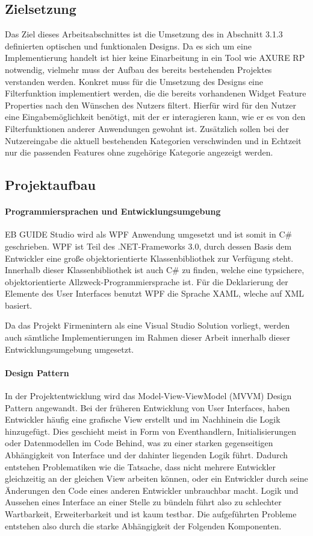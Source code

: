 \subsection {Zielsetzung}
Das Ziel dieses Arbeitsabschnittes ist die Umsetzung des in Abschnitt 3.1.3 definierten optischen und funktionalen Designs.
Da es sich um eine Implementierung handelt ist hier keine Einarbeitung in ein Tool wie AXURE RP notwendig, vielmehr muss der Aufbau des bereits bestehenden Projektes verstanden werden.
Konkret muss für die Umsetzung des Designs eine Filterfunktion implementiert werden, die die bereits vorhandenen Widget Feature Properties nach den Wünschen des Nutzers filtert.
Hierfür wird für den Nutzer eine Eingabemöglichkeit benötigt, mit der er interagieren kann, wie er es von den Filterfunktionen anderer Anwendungen gewohnt ist.
Zusätzlich sollen bei der Nutzereingabe die aktuell bestehenden Kategorien verschwinden und in Echtzeit nur die passenden Features ohne zugehörige Kategorie angezeigt werden.

\subsection {Projektaufbau}

\paragraph{Programmiersprachen und Entwicklungsumgebung}
EB GUIDE Studio wird als WPF Anwendung umgesetzt und ist somit in C\# geschrieben.
WPF ist Teil des .NET-Frameworks 3.0, durch dessen Basis dem Entwickler eine große objektorientierte Klassenbibliothek zur Verfügung steht.
Innerhalb dieser Klassenbibliothek ist auch C\# zu finden, welche eine typsichere, objektorientierte Allzweck-Programmiersprache ist.
Für die Deklarierung der Elemente des User Interfaces benutzt WPF die Sprache XAML, wleche auf XML basiert.

Da das Projekt Firmenintern als eine Visual Studio Solution vorliegt, werden auch sämtliche Implementierungen im Rahmen dieser Arbeit innerhalb dieser Entwicklungsumgebung umgesetzt.

\paragraph{Design Pattern}
In der Projektentwicklung wird das Model-View-ViewModel (MVVM) Design Pattern angewandt.
Bei der früheren Entwicklung von User Interfaces, haben Entwickler häufig eine grafische View erstellt und im Nachhinein die Logik hinzugefügt.
Dies geschieht meist in Form von Eventhandlern, Initialisierungen oder Datenmodellen im Code Behind, was zu einer starken gegenseitigen Abhängigkeit von Interface und der dahinter liegenden Logik führt.
Dadurch entstehen Problematiken wie die Tatsache, dass nicht mehrere Entwickler gleichzeitig an der gleichen View arbeiten können, oder ein Entwickler durch seine Änderungen den Code eines anderen Entwickler unbrauchbar macht.
Logik und Aussehen eines Interface an einer Stelle zu bündeln führt also zu schlechter Wartbarkeit, Erweiterbarkeit und ist kaum testbar\cite{.g}.
Die aufgeführten Probleme entstehen also durch die starke Abhängigkeit der Folgenden Komponenten.

